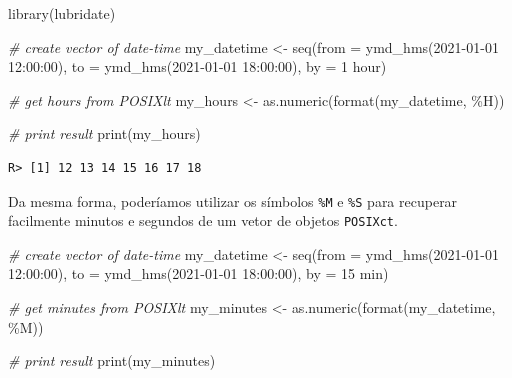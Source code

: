 \documentclass[
  11pt,
]{book}
\newenvironment{Shaded}{\begin{snugshade}}{\end{snugshade}}
\newcommand{\AttributeTok}[1]{\textcolor[rgb]{0.61,0.61,0.61}{#1}}
\newcommand{\CommentTok}[1]{\textcolor[rgb]{0.37,0.37,0.37}{\textit{#1}}}
\newcommand{\FunctionTok}[1]{\textcolor[rgb]{0,0,0}{#1}}
\newcommand{\NormalTok}[1]{#1}
\newcommand{\OtherTok}[1]{\textcolor[rgb]{0.37,0.37,0.37}{#1}}
\newcommand{\StringTok}[1]{\textcolor[rgb]{0.5,0.5,0.5}{#1}}
\begin{document}
\begin{Shaded}
\begin{Highlighting}[]
\FunctionTok{library}\NormalTok{(lubridate)}

\CommentTok{\# create vector of date{-}time}
\NormalTok{my\_datetime }\OtherTok{\textless{}{-}} \FunctionTok{seq}\NormalTok{(}\AttributeTok{from =} \FunctionTok{ymd\_hms}\NormalTok{(}\StringTok{\textquotesingle{}2021{-}01{-}01 12:00:00\textquotesingle{}}\NormalTok{),}
                   \AttributeTok{to =} \FunctionTok{ymd\_hms}\NormalTok{(}\StringTok{\textquotesingle{}2021{-}01{-}01 18:00:00\textquotesingle{}}\NormalTok{),}
                   \AttributeTok{by =} \StringTok{\textquotesingle{}1 hour\textquotesingle{}}\NormalTok{)}

\CommentTok{\# get hours from POSIXlt}
\NormalTok{my\_hours }\OtherTok{\textless{}{-}} \FunctionTok{as.numeric}\NormalTok{(}\FunctionTok{format}\NormalTok{(my\_datetime, }\StringTok{\textquotesingle{}\%H\textquotesingle{}}\NormalTok{))}

\CommentTok{\# print result}
\FunctionTok{print}\NormalTok{(my\_hours)}
\end{Highlighting}
\end{Shaded}

\begin{verbatim}
R> [1] 12 13 14 15 16 17 18
\end{verbatim}

Da mesma forma, poderíamos utilizar os símbolos \texttt{\%M} e \texttt{\%S} para recuperar facilmente minutos e segundos de um vetor de objetos \texttt{POSIXct}.

\begin{Shaded}
\begin{Highlighting}[]
\CommentTok{\# create vector of date{-}time}
\NormalTok{my\_datetime }\OtherTok{\textless{}{-}} \FunctionTok{seq}\NormalTok{(}\AttributeTok{from =} \FunctionTok{ymd\_hms}\NormalTok{(}\StringTok{\textquotesingle{}2021{-}01{-}01 12:00:00\textquotesingle{}}\NormalTok{),}
                   \AttributeTok{to =} \FunctionTok{ymd\_hms}\NormalTok{(}\StringTok{\textquotesingle{}2021{-}01{-}01 18:00:00\textquotesingle{}}\NormalTok{),}
                   \AttributeTok{by =} \StringTok{\textquotesingle{}15 min\textquotesingle{}}\NormalTok{)}

\CommentTok{\# get minutes from POSIXlt}
\NormalTok{my\_minutes }\OtherTok{\textless{}{-}} \FunctionTok{as.numeric}\NormalTok{(}\FunctionTok{format}\NormalTok{(my\_datetime, }\StringTok{\textquotesingle{}\%M\textquotesingle{}}\NormalTok{))}

\CommentTok{\# print result}
\FunctionTok{print}\NormalTok{(my\_minutes)}
\end{Highlighting}
\end{Shaded}
\end{document}
